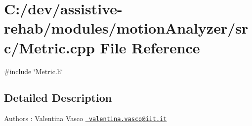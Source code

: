 \section{C\+:/dev/assistive-\/rehab/modules/motion\+Analyzer/src/\+Metric.cpp File Reference}
\label{Metric_8cpp}
{\ttfamily \#include \char`\"{}Metric.\+h\char`\"{}}\newline


\subsection{Detailed Description}
\begin{DoxyAuthor}{Authors}
\+: Valentina Vasco \href{mailto:valentina.vasco@iit.it}{\texttt{ valentina.\+vasco@iit.\+it}} 
\end{DoxyAuthor}
